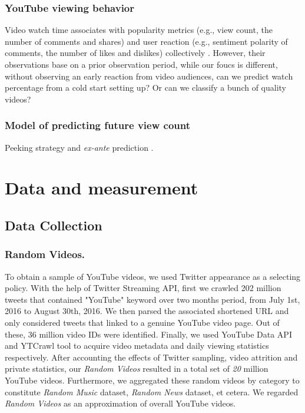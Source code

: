 \documentclass[letterpaper]{article}
\begin{document}
\subsubsection{YouTube viewing behavior} Video watch time associates with popularity metrics (e.g., view count, the number of comments and shares) and user reaction (e.g., sentiment polarity of comments, the number of likes and dislikes) collectively \cite{Park:2016data}. However, their observations base on a prior observation period, while our foucs is different, without observing an early reaction from video audiences, can we predict watch percentage from a cold start setting up? Or can we classify a bunch of quality videos?

\subsubsection{Model of predicting future view count} Peeking strategy and \textit{ex-ante} prediction \cite{martin2016exploring}.


\section{Data and measurement}

\subsection{Data Collection}

\subsubsection{Random Videos.} To obtain a sample of YouTube videos, we used Twitter appearance as a selecting policy. With the help of Twitter Streaming API, first we crawled 202 million tweets that contained "YouTube" keyword over two months period, from July 1st, 2016 to August 30th, 2016. We then parsed the associated shortened URL and only considered tweets that linked to a genuine YouTube video page. Out of these, 36 million video IDs were identified. Finally, we used YouTube Data API and YTCrawl tool \cite{Yu:2015lifecyle} to acquire video metadata and daily viewing statistics respectively. After accounting the effects of Twitter sampling, video attrition and private statistics, our \textit{Random Videos} resulted in a total set of \textit{20} million YouTube videos. Furthermore, we aggregated these random videos by category to constitute \textit{Random Music} dataset, \textit{Random News} dataset, et cetera. We regarded \textit{Random Videos} as an approximation of overall YouTube videos.
\end{document}
